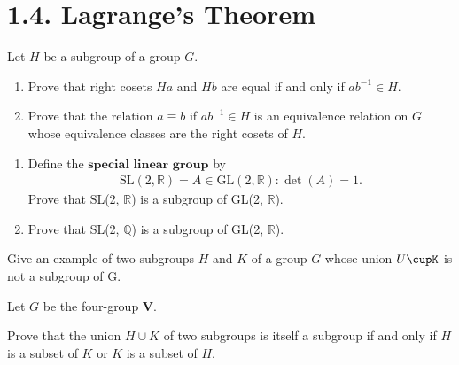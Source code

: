 \documentclass[12pt]{article}
\newenvironment{exercise}[2][Exercise]{\begin{trivlist}
\item[\hskip \labelsep {\bfseries #1}\hskip \labelsep {\bfseries #2.}]}
{\end{trivlist}}
\newenvironment{hint}[2][Hint]{\begin{trivlist}
    \item[\hskip \labelsep {\bfseries #1}\hskip \labelsep {\bfseries #2.}]}
    {\end{trivlist}}
\begin{document}
\section*{1.4.  Lagrange's Theorem}

\begin{exercise}{1.38}
    Let $H$ be a subgroup of a group $G$.
    \begin{enumerate}
        \item[(i)] Prove that right cosets $Ha$ and $Hb$ are equal if and only if $ab^{-1} \in H$.
        \item[(ii)] Prove that the relation $a \equiv b$ if $ab^{-1} \in H$ is an equivalence relation 
        on $G$ whose equivalence classes are the right cosets of $H$.
    \end{enumerate}
    
\end{exercise}




\begin{exercise}{1.39}
    \begin{enumerate}
        \item[(i)] Define the $\textbf{special linear group}$ by
        \begin{align*}
            \text{SL}(2, \mathbb{R}) = {A \in \text{GL} (2, \mathbb{R}): \det(A)=1}.
        \end{align*}
        Prove that SL(2, $\mathbb{R}$) is a subgroup of GL(2, $\mathbb{R}$).
        \item[(i)] Prove that SL(2, $\mathbb{Q}$) is a subgroup of GL(2, $\mathbb{R}$).
    \end{enumerate}
\end{exercise}




\begin{exercise}{1.40}
    \begin{enumerate}
        \item[(i)] Give an example of two subgroups $H$ and $K$ of a group $G$ whose union $U\cupK$ is not a subgroup of G. 
        \begin{hint}{} Let $G$ be the four-group $\textbf{V}$.
        \item[(ii)] Prove that the union $H\cup K$ of two subgroups is itself a subgroup if and only if $H$ is a subset of $K$
        or $K$ is a subset of $H$.
            
        \end{hint}
    \end{enumerate}

\end{exercise}
\end{document}
